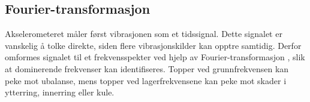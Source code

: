 \subsection{Fourier-transformasjon}
Akselerometeret måler først vibrasjonen som et tidssignal. Dette signalet er vanskelig å tolke direkte, siden flere vibrasjonskilder kan opptre samtidig. Derfor omformes signalet til et frekvensspekter ved hjelp av Fourier-transformasjon \parencite{vibrasjon1}, slik at dominerende frekvenser kan identifiseres. Topper ved grunnfrekvensen kan peke mot ubalanse, mens topper ved lagerfrekvensene kan peke mot skader i ytterring, innerring eller kule.
